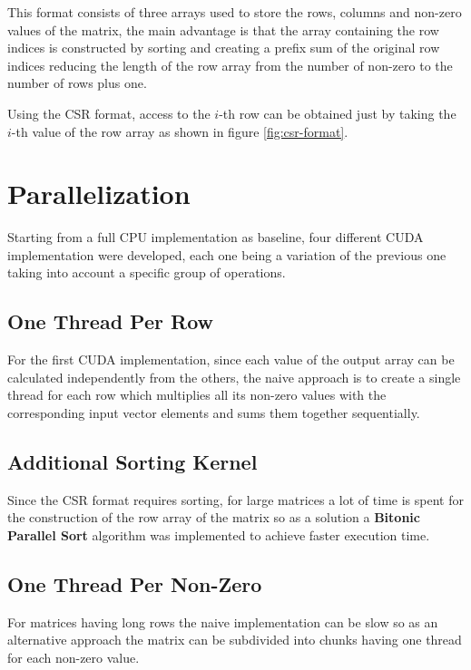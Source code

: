 \documentclass[conference]{IEEEtran}
\begin{document}
    This format consists of three arrays used to store the rows, columns and
    non-zero values of the matrix, the main advantage is that the array
    containing the row indices is constructed by sorting and creating a prefix
    sum of the original row indices reducing the length of the row array from
    the number of non-zero to the number of rows plus one.

    Using the CSR format, access to the $i$-th row can be obtained just by
    taking the $i$-th value of the row array as shown in figure
    \ref{fig:csr-format}.

    \section{Parallelization}

    Starting from a full CPU implementation as baseline, four different CUDA
    implementation were developed, each one being a variation of the previous
    one taking into account a specific group of operations.

    \subsection{One Thread Per Row}

    For the first CUDA implementation, since each value of the output array can
    be calculated independently from the others, the naive approach is to
    create a single thread for each row which multiplies all its non-zero
    values with the corresponding input vector elements and sums them together
    sequentially.

    \subsection{Additional Sorting Kernel}

    Since the CSR format requires sorting, for large matrices a lot of time is
    spent for the construction of the row array of the matrix so as a solution
    a \textbf{Bitonic Parallel Sort} algorithm was implemented to achieve
    faster execution time.

    \subsection{One Thread Per Non-Zero}

    For matrices having long rows the naive implementation can be slow so as an
    alternative approach the matrix can be subdivided into chunks having one
    thread for each non-zero value.
\end{document}
